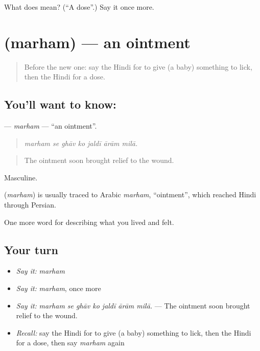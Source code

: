 \begin{tcolorbox}[breakable,colback=teal!4,colframe=teal!35!black,title={Before you move on}]
What does  mean? (\textquotedblleft{}A dose\textquotedblright{}.) Say it once more.
\end{tcolorbox}
\section[\texorpdfstring{\hi{मरहम} (marham)}{मरहम (marham)}]{ (marham) — an ointment}

\label{lesson:HI-C489-marham}



\begin{quote}
Before the new one: say the Hindi for to give (a baby) something to lick, then the Hindi for a dose.
\end{quote}

\subsection*{You'll want to know: }
\textbf{} — \emph{marham} — \textquotedblleft{}an ointment\textquotedblright{}.

\begin{quote}
      
\end{quote}

\begin{quote}
\emph{marham se ghāv ko jaldī ārām milā.}
\end{quote}

\begin{quote}
The ointment soon brought relief to the wound.
\end{quote}

Masculine.

\begin{cousinweb}
\textbf{} (\emph{marham}) is usually traced to Arabic \emph{marham}, \textquotedblleft{}ointment\textquotedblright{}, which reached Hindi through Persian.
\end{cousinweb}

\begin{grammarlens}[title={What you've built}]
One more word for describing what you lived and felt.
\end{grammarlens}

\subsection*{Your turn}
\begin{itemize}
\raggedright
  \item \emph{Say it:} \emph{marham}
  \item \emph{Say it:} \emph{marham}, once more
  \item \emph{Say it:} \emph{marham se ghāv ko jaldī ārām milā.} — The ointment soon brought relief to the wound.
  \item \emph{Recall:} say the Hindi for to give (a baby) something to lick, then the Hindi for a dose, then say \emph{marham} again
\end{itemize}

